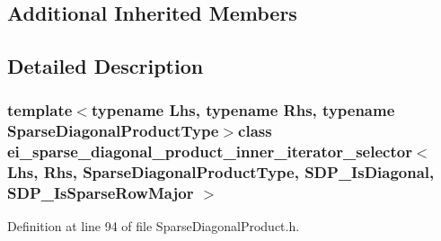 \subsection*{Additional Inherited Members}


\subsection{Detailed Description}
\subsubsection*{template$<$typename Lhs, typename Rhs, typename Sparse\-Diagonal\-Product\-Type$>$class ei\-\_\-sparse\-\_\-diagonal\-\_\-product\-\_\-inner\-\_\-iterator\-\_\-selector$<$ Lhs, Rhs, Sparse\-Diagonal\-Product\-Type, S\-D\-P\-\_\-\-Is\-Diagonal, S\-D\-P\-\_\-\-Is\-Sparse\-Row\-Major $>$}



Definition at line 94 of file Sparse\-Diagonal\-Product.\-h.



